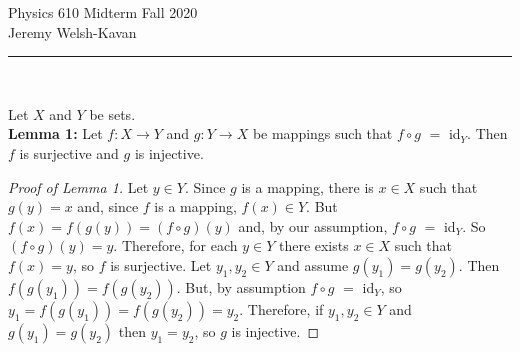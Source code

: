 \documentclass[]{book}
\begin{document}
\begin{center}
{\Large Physics 610 Midterm Fall 2020}\\
{Jeremy Welsh-Kavan}\\
\end{center}
\vspace{0.2 cm}
\begin{center}
\noindent\rule{15cm}{0.4pt} \\
\end{center}
Let $X$ and $Y$ be sets.\\

{\bf Lemma 1:} Let $f:X\to Y$ and $g:Y\to X$ be mappings such that $f \circ g$ $=$ id$_Y$. Then $f$ is surjective and $g$ is injective.
\begin{proof}[Proof of Lemma 1]
Let $y \in Y$. Since $g$ is a mapping, there is $x \in X$ such that $g(y)=x$ and, since $f$ is a mapping, $f(x) \in Y$. But $f(x) = f(g(y)) = (f\circ g)(y)$ and, by our assumption, $f \circ g$ $=$ id$_Y$. So $(f\circ g)(y)=y$. Therefore, for each $y\in Y$ there exists $x\in X$ such that $f(x)=y$, so $f$ is surjective.
Let $y_1,y_2\in Y$ and assume $g(y_1)=g(y_2)$. Then $f(g(y_1))=f(g(y_2))$. But, by assumption $f \circ g$ $=$ id$_Y$, so $y_1=f(g(y_1))=f(g(y_2))=y_2$. Therefore, if $y_1,y_2\in Y$ and $g(y_1)=g(y_2)$ then $y_1=y_2$, so $g$ is injective.
\end{proof}
\end{document}
